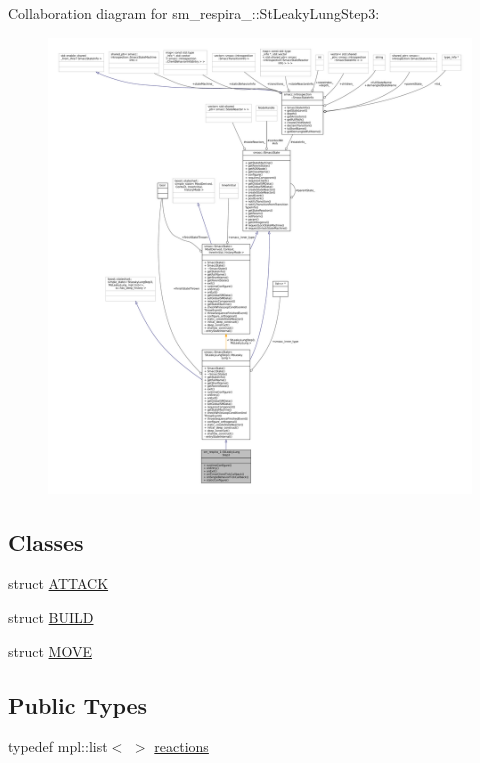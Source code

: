 Collaboration diagram for sm\+\_\+respira\+\_\+:\+:St\+Leaky\+Lung\+Step3\+:
\nopagebreak
\begin{figure}[H]
\begin{center}
\leavevmode
\includegraphics[width=350pt]{structsm__respira__1_1_1StLeakyLungStep3__coll__graph}
\end{center}
\end{figure}
\subsection*{Classes}
\begin{DoxyCompactItemize}
\item 
struct \hyperlink{structsm__respira__1_1_1StLeakyLungStep3_1_1ATTACK}{A\+T\+T\+A\+CK}
\item 
struct \hyperlink{structsm__respira__1_1_1StLeakyLungStep3_1_1BUILD}{B\+U\+I\+LD}
\item 
struct \hyperlink{structsm__respira__1_1_1StLeakyLungStep3_1_1MOVE}{M\+O\+VE}
\end{DoxyCompactItemize}
\subsection*{Public Types}
\begin{DoxyCompactItemize}
\item 
typedef mpl\+::list$<$ $>$ \hyperlink{structsm__respira__1_1_1StLeakyLungStep3_a5f16ee57548be4a1487c0dc6c9965737}{reactions}
\end{DoxyCompactItemize}
